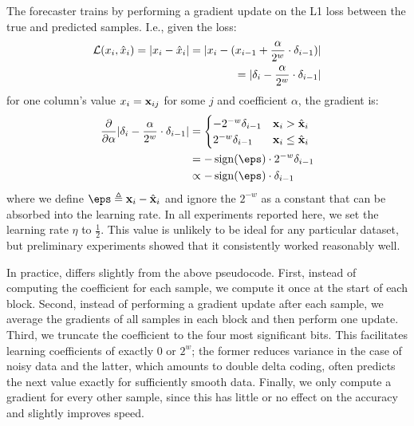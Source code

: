 The forecaster trains by performing a gradient update on the L1 loss between the true and predicted samples. I.e., given the loss:
\begin{align}
    \mathcal{L}(x_i, \hat{x}_{i}) = \lvert x_i - \hat{x}_i\rvert
    = \lvert x_i - (x_{i-1} + \frac{\alpha}{2^w} \cdot \delta_{i-1})\rvert \\
    = \lvert\delta_{i} - \frac{\alpha}{2^w} \cdot \delta_{i-1}\rvert
\end{align}
for one column's value $x_i = \mathbf{x}_{ij}$ for some $j$ and coefficient $\alpha$, the gradient is:
\begin{align}
        \frac{\partial }{\partial \alpha} \abs{\delta_{i} - \frac{\alpha}{2^w} \cdot \delta_{i-1}}
&= \begin{cases}
        -{2^{-w}}\vdelta_{i-1} & \x_{i} > \hat{\x}_{i} \\
        {2^{-w}}\vdelta_{i-1} & \x_{i} \le \hat{\x}_{i}
\end{cases} \\
&= -\sign(\eps) \cdot {2^{-w}}\vdelta_{i-1} \\
&\propto -\sign(\eps) \cdot \vdelta_{i-1}
\end{align}
where we define $\eps \triangleq \x_{i} - \hat{\x}_{i}$ and ignore the $2^{-w}$ as a constant that can be absorbed into the learning rate. In all experiments reported here, we set the learning rate $\eta$ to $\frac{1}{2}$. This value is unlikely to be ideal for any particular dataset, but preliminary experiments showed that it consistently worked reasonably well. %

In practice, \fire differs slightly from the above \text{} pseudocode. First, instead of computing the coefficient for each sample, we compute it once at the start of each block. Second, instead of performing a gradient update after each sample, we average the gradients of all samples in each block and then perform one update. Third, we truncate the coefficient to the four most significant bits. This facilitates learning coefficients of exactly 0 or $2^w$; the former reduces variance in the case of noisy data and the latter, which amounts to double delta coding, often predicts the next value exactly for sufficiently smooth data. Finally, we only compute a gradient for every other sample, since this has little or no effect on the accuracy and slightly improves speed.

